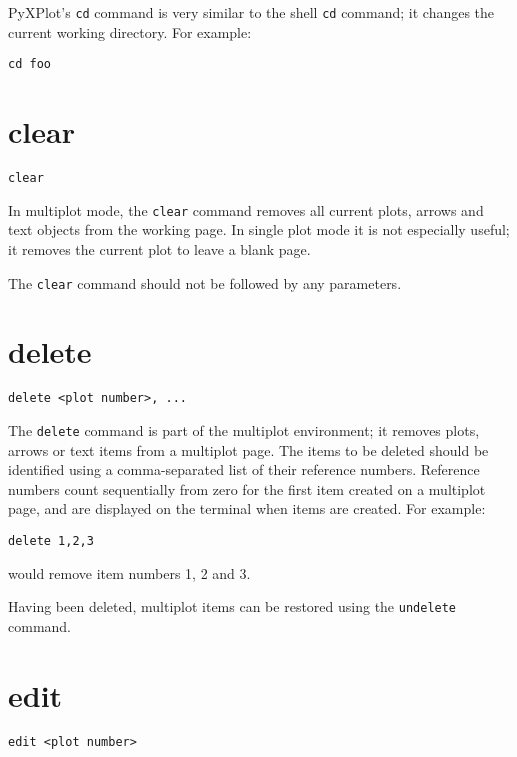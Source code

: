 PyXPlot's {\tt cd} command is very similar to the shell {\tt cd} command; it 
changes the current working directory. For example:

\begin{verbatim}
cd foo
\end{verbatim}

\section{clear}

\begin{verbatim}
clear
\end{verbatim}

In multiplot mode, the {\tt clear} command removes all current plots, arrows
and text objects from the working page. In single plot mode it is not
especially useful; it removes the current plot to leave a blank page.

The {\tt clear} command should not be followed by any parameters.

\section{delete}

\begin{verbatim}
delete <plot number>, ...
\end{verbatim}

The {\tt delete} command is part of the multiplot environment; it removes
plots, arrows or text items from a multiplot page. The items to be deleted should be
identified using a comma-separated list of their reference numbers.  Reference
numbers count sequentially from zero for the first item created on a multiplot
page, and are displayed on the terminal when items are created.  For example:

\begin{verbatim}
delete 1,2,3
\end{verbatim}

\noindent would remove item numbers 1, 2 and 3.

Having been deleted, multiplot items can be restored using the {\tt undelete}
command.

\section{edit}

\begin{verbatim}
edit <plot number>
\end{verbatim}

